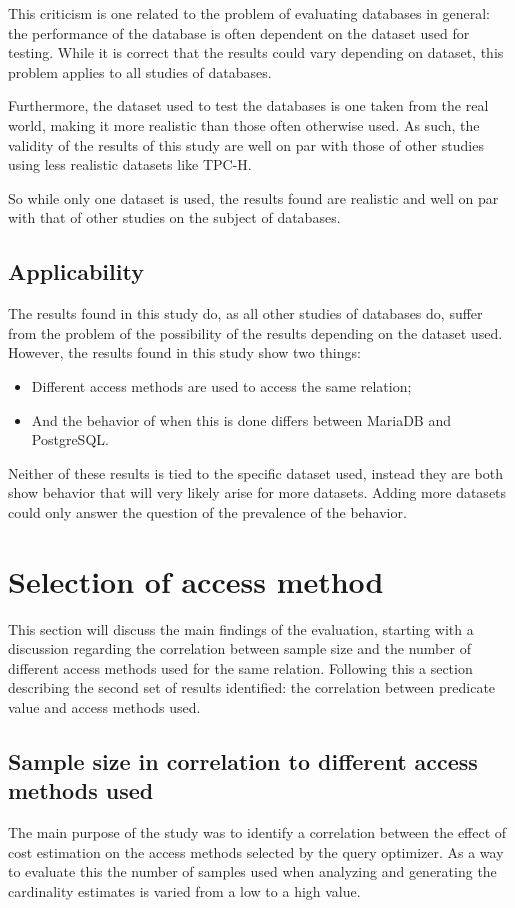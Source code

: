 This criticism is one related to the problem of evaluating databases in general:
the performance of the database is often dependent on the dataset used for
testing. While it is correct that the results could vary depending on dataset,
this problem applies to all studies of databases.

Furthermore, the dataset used to test the databases is one taken from the real
world, making it more realistic than those often otherwise used. As such, the
validity of the results of this study are well on par with those of other
studies using less realistic datasets like TPC-H.

So while only one dataset is used, the results found are realistic and well on
par with that of other studies on the subject of databases.

\subsection{Applicability}
The results found in this study do, as all other studies of databases do, suffer
from the problem of the possibility of the results depending on the dataset
used. However, the results found in this study show two things:
\begin{itemize}
\item Different access methods are used to access the same relation;
\item And the behavior of when this is done differs between MariaDB and
  PostgreSQL.\@
\end{itemize}

Neither of these results is tied to the specific dataset used, instead they are
both show behavior that will very likely arise for more datasets. Adding more
datasets could only answer the question of the prevalence of the behavior.

\section{Selection of access method}\label{sec:accessmethods}
This section will discuss the main findings of the evaluation, starting with a
discussion regarding the correlation between sample size and the number of
different access methods used for the same relation. Following this a section
describing the second set of results identified: the correlation between
predicate value and access methods used.

\subsection{Sample size in correlation to different access methods used}
The main purpose of the study was to identify a correlation between the effect
of cost estimation on the access methods selected by the query optimizer. As a
way to evaluate this the number of samples used when analyzing and
generating the cardinality estimates is varied from a low to a high value.

